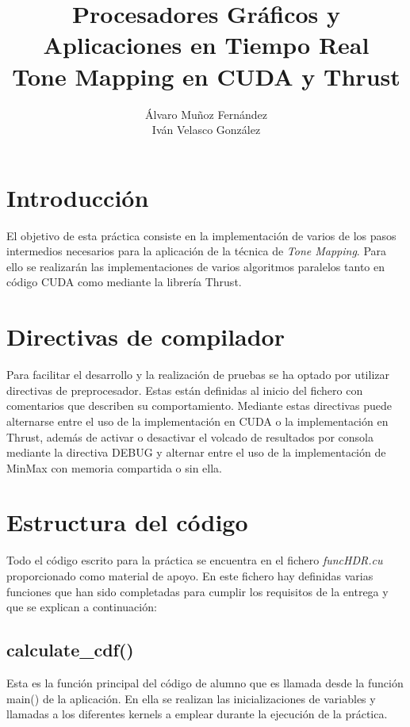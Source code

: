 \documentclass[10pt,oneside,a4paper]{article}
\begin{document}
\begin{titlepage}

\title{\Huge Procesadores Gráficos y Aplicaciones en Tiempo Real  \\[0.7in] \LARGE Tone Mapping en CUDA y Thrust\\[3.6in]}
\date{}
\author{Álvaro Muñoz Fernández\\
Iván Velasco González}
\maketitle
\thispagestyle{empty}
\end{titlepage}
\newpage
\tableofcontents
\newpage

\section{Introducción}
El objetivo de esta práctica consiste en la implementación de varios de los pasos intermedios necesarios para la aplicación de la técnica de \textit{Tone Mapping}. Para ello se realizarán las implementaciones de varios algoritmos paralelos tanto en código CUDA como mediante la librería Thrust.\\

\section{Directivas de compilador}
Para facilitar el desarrollo y la realización de pruebas se ha optado por utilizar directivas de preprocesador. Estas están definidas al inicio del fichero con comentarios que describen su comportamiento. Mediante estas directivas puede alternarse entre el uso de la implementación en CUDA o la implementación en Thrust, además de activar o desactivar el volcado de resultados por consola mediante la directiva DEBUG y alternar entre el uso de la implementación de MinMax con memoria compartida o sin ella.

\section{Estructura del código}
Todo el código escrito para la práctica se encuentra en el fichero \textit{funcHDR.cu} proporcionado como material de apoyo. En este fichero hay definidas varias funciones que han sido completadas para cumplir los requisitos de la entrega y que se explican a continuación:

\subsection{calculate\_cdf()}
Esta es la función principal del código de alumno que es llamada desde la función main() de la aplicación. En ella se realizan las inicializaciones de variables y llamadas a los diferentes kernels a emplear durante la ejecución de la práctica.\\
\end{document}
